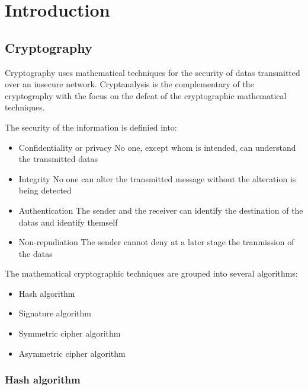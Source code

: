 \chapter{Introduction}

\section{Cryptography} %

Cryptography uses mathematical techniques for the security of datas transmitted
over an insecure network. \newline
Cryptanalysis is the complementary of the cryptography
with the focus on the defeat of the cryptographic mathematical
techniques.\newline

The security of the information is definied into:
\begin{itemize}
  \item Confidentiality or privacy\newline
  No one, except whom is intended, can understand the transmitted datas
  \item Integrity\newline
  No one can alter the transmitted message without the alteration is being
  detected
  \item Authentication \newline
  The sender and the receiver can identify the destination of the datas and
  identify themself
  \item Non-repudiation\newline
  The sender cannot deny at a later stage the tranmission of the datas\newline
\end{itemize}

The mathematical cryptographic techniques are grouped into several algorithms:
\begin{itemize}
  \item Hash algorithm
  \item Signature algorithm
  \item Symmetric cipher algorithm
  \item Asymmetric cipher algorithm
\end{itemize}

\newpage

\subsection{Hash algorithm}

